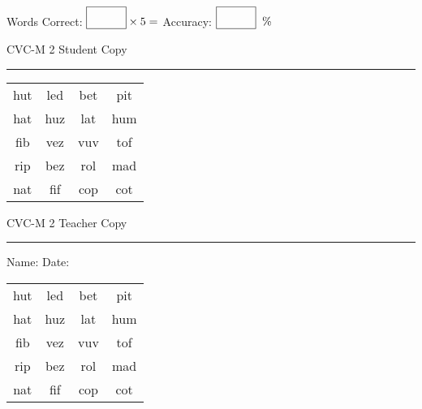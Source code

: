 \documentclass{memoir}
\begin{document}
\small

Words Correct: $\fbox{\phantom{\huge 100}} \times 5 = $ Accuracy: $\fbox{\phantom{\huge 100}}\;\; \%$ 

\vfill

\newpage


\footnotesize \noindent
CVC-M 2 \hfill Student Copy
\smallskip
\hrule

\Large

\setlength{\tabcolsep}{14pt}
\def\arraystretch{2}

{\selectfont


\begin{vplace}[0.5]
\begin{center}
\begin{tabular}{cccc}
hut & led & bet & pit \\
hat & huz & lat & hum \\
fib & vez & vuv & tof \\
rip & bez & rol & mad \\
nat & fif & cop & cot \\
\end{tabular}
\end{center}
\end{vplace}

}

\newpage

\footnotesize \noindent
CVC-M 2 \hfill Teacher Copy
\smallskip
\hrule

\small

\vfill

\noindent
Name: \underline{\hspace{1.75in}} \hfill Date: \underline{\hspace{1in}}

\Large

{\selectfont


\begin{vplace}[0.5]
\begin{center}
\begin{tabular}{cccc}
hut & led & bet & pit \\
hat & huz & lat & hum \\
fib & vez & vuv & tof \\
rip & bez & rol & mad \\
nat & fif & cop & cot \\
\end{tabular}
\end{center}
\end{vplace}



}
\end{document}
